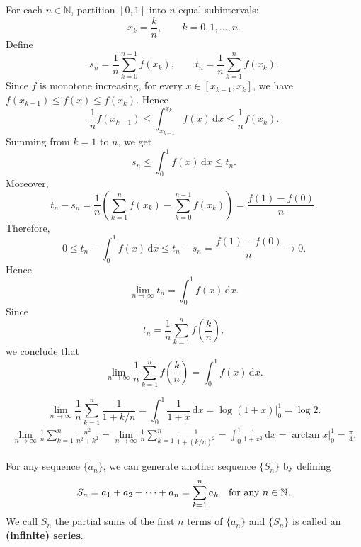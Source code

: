     \begin{proofenv}
        For each \(n\in\mathbb{N}\), partition \([0,1]\) into \(n\) equal subintervals:
        \[
        x_k=\frac{k}{n},
        \qquad k=0,1,\dots,n.
        \]
        Define
        \[
        s_n=\frac{1}{n}\sum_{k=0}^{n-1}f(x_k),
        \qquad
        t_n=\frac{1}{n}\sum_{k=1}^{n}f(x_k).
        \]
        Since \(f\) is monotone increasing, for every \(x\in[x_{k-1},x_k]\), we have
        \(
        f(x_{k-1})\le f(x)\le f(x_k).
        \)
        Hence
        \[
        \frac{1}{n}f(x_{k-1})
        \le
        \int_{x_{k-1}}^{x_k}f(x)\,\mathrm{d}x
        \le
        \frac{1}{n}f(x_k).
        \]
        Summing from \(k=1\) to \(n\), we get
        \[
        s_n\le \int_0^1 f(x)\,\mathrm{d}x\le t_n.
        \]
        Moreover,
        \[
        t_n-s_n
        =
        \frac{1}{n}
        \left(
        \sum_{k=1}^{n}f(x_k)-\sum_{k=0}^{n-1}f(x_k)
        \right)
        =
        \frac{f(1)-f(0)}{n}.
        \]
        Therefore,
        \[
        0\le t_n-\int_0^1 f(x)\,\mathrm{d}x
        \le t_n-s_n
        =
        \frac{f(1)-f(0)}{n}\to 0.
        \]
        Hence
        \[
        \lim_{n\to\infty}t_n
        =
        \int_0^1 f(x)\,\mathrm{d}x.
        \]
        Since
        \[
        t_n
        =
        \frac{1}{n}\sum_{k=1}^{n}f\left(\frac{k}{n}\right),
        \]
        we conclude that
        \[
        \lim_{n\to\infty}
        \frac{1}{n}\sum_{k=1}^{n}f\left(\frac{k}{n}\right)
        =
        \int_0^1 f(x)\,\mathrm{d}x.
        \]
    \end{proofenv}
    \begin{exampleenv}
        \[
        \lim_{n\to\infty}\frac{1}{n}\sum_{k=1}^{n}\frac{1}{1+k/n}
        =
        \int_0^1 \frac{1}{1+x}\,\mathrm{d}x
        =
        \log(1+x)\Big|_0^1
        =
        \log 2.
        \]
        \[
        \begin{aligned}
        \lim_{n\to\infty}\frac{1}{n}\sum_{k=1}^{n}\frac{n^2}{n^2+k^2}
        =
        \lim_{n\to\infty}\frac{1}{n}\sum_{k=1}^{n}
        \frac{1}{1+(k/n)^2}
        =
        \int_0^1 \frac{1}{1+x^2}\,\mathrm{d}x 
        =
        \arctan x\Big|_0^1
        =
        \frac{\pi}{4}.
        \end{aligned}
        \]
    \end{exampleenv}
    \begin{definitionenv}
        For any sequence $\{a_n\}$, we can generate another sequence $\{S_n\}$ by defining
        \[
        S_n = a_1 + a_2 + \cdots + a_n = \sum_{k=1}^n a_k \quad \text{for any } n\in \mathbb{N}.
        \]
        We call $S_n$ the partial sums of the first $n$ terms of $\{a_n\}$ and $\{S_n\}$ is called an \textbf{(infinite) series}.
    \end{definitionenv}

